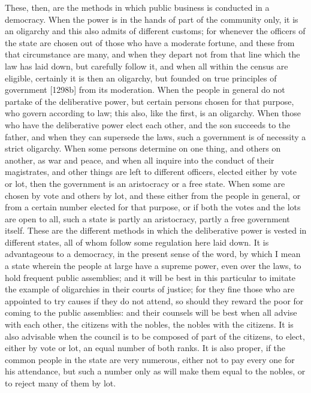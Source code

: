 These, then, are the methods in which public business is conducted in a
democracy. When the power is in the hands of part of the community only,
it is an oligarchy and this also admits of different customs; for whenever
the officers of the state are chosen out of those who have a moderate
fortune, and these from that circumstance are many, and when they depart
not from that line which the law has laid down, but carefully follow it,
and when all within the census are eligible, certainly it is then an
oligarchy, but founded on true principles of government [1298b] from its
moderation. When the people in general do not partake of the deliberative
power, but certain persons chosen for that purpose, who govern according
to law; this also, like the first, is an oligarchy. When those who have
the deliberative power elect each other, and the son succeeds to the
father, and when they can supersede the laws, such a government is of
necessity a strict oligarchy. When some persons determine on one thing,
and others on another, as war and peace, and when all inquire into the
conduct of their magistrates, and other things are left to different
officers, elected either by vote or lot, then the government is an
aristocracy or a free state. When some are chosen by vote and others by
lot, and these either from the people in general, or from a certain number
elected for that purpose, or if both the votes and the lots are open to
all, such a state is partly an aristocracy, partly a free government
itself. These are the different methods in which the deliberative power is
vested in different states, all of whom follow some regulation here laid
down. It is advantageous to a democracy, in the present sense of the word,
by which I mean a state wherein the people at large have a supreme power,
even over the laws, to hold frequent public assemblies; and it will be
best in this particular to imitate the example of oligarchies in their
courts of justice; for they fine those who are appointed to try causes if
they do not attend, so should they reward the poor for coming to the
public assemblies: and their counsels will be best when all advise with
each other, the citizens with the nobles, the nobles with the citizens. It
is also advisable when the council is to be composed of part of the
citizens, to elect, either by vote or lot, an equal number of both ranks.
It is also proper, if the common people in the state are very numerous,
either not to pay every one for his attendance, but such a number only as
will make them equal to the nobles, or to reject many of them by lot.

